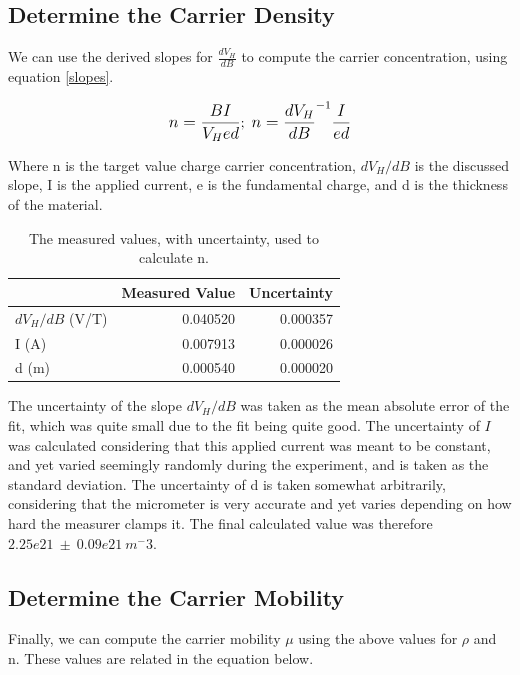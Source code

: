 \documentclass[aps,prl,reprint]{revtex4-2}
\begin{document}
\subsection{Determine the Carrier Density}

We can use the derived slopes for $\frac{dV_H}{dB}$ to compute the carrier concentration, using
equation \ref{slopes}.

\begin{equation}
	\mathlarger{n=\frac{BI}{V_Hed}} ;\ 
	\mathlarger{n=\frac{dV_H}{dB}^{-1}\frac{I}{ed}}
    \label{slopes}
\end{equation}

Where n is the target value charge carrier concentration, $dV_H/dB$ is the discussed slope, I is
the applied current, e is the fundamental charge, and d is the thickness of the material. \\


\begin{table}[h]
\begin{tabular}{lrr}
\toprule
{} &  Measured Value &  Uncertainty \\
\hline
$dV_H/dB$ (V/T) &        0.040520 &     0.000357 \\
I (A)         &        0.007913 &     0.000026 \\
d (m)         &        0.000540 &     0.000020 \\
\hline
\hline
\bottomrule
\end{tabular}
\caption{The measured values, with uncertainty, used to calculate n.}
\end{table}

The uncertainty of the slope $dV_H/dB$ was taken as the mean absolute error of the fit, which
was quite small due to the fit being quite good. The uncertainty of $I$ was calculated 
considering that this applied current was meant to be constant, and yet varied seemingly randomly
during the experiment, and is taken as the standard deviation. The uncertainty of d is taken
somewhat arbitrarily, considering that the micrometer is very accurate and yet varies depending
on how hard the measurer clamps it. The final calculated value was therefore $2.25e21\ \pm\ 0.09e21\ m^-3$.


\subsection{Determine the Carrier Mobility}

Finally, we can compute the carrier mobility $\mu$ using the above values for $\rho$ and n. 
These values are related in the equation below.
\end{document}
